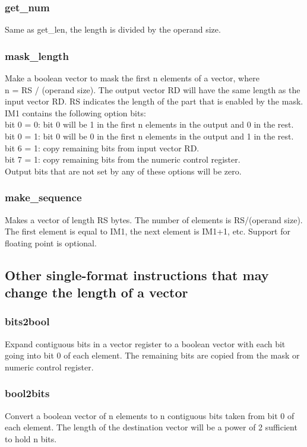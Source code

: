 \documentclass[forwardcom.tex]{subfiles}
\begin{document}
\subsubsection{get\_num}
Same as get\_len, the length is divided by the operand size.

\subsubsection{mask\_length}
Make a boolean vector to mask the first n elements of a vector, where \\
n = RS / (operand size). The output vector RD will have the same length as the input vector RD. RS indicates the length of the part that is enabled by the mask. IM1 contains the following option bits: \\
bit 0 = 0: bit 0 will be 1 in the first n elements in the output and 0 in the rest. \\
bit 0 = 1: bit 0 will be 0 in the first n elements in the output and 1 in the rest. \\
bit 6 = 1: copy remaining bits from input vector RD. \\
bit 7 = 1: copy remaining bits from the numeric control register. \\
Output bits that are not set by any of these options will be zero.

\subsubsection{make\_sequence}
Makes a vector of length RS bytes. The number of elements is RS/(operand size).
The first element is equal to IM1, the next element is IM1+1, etc.
Support for floating point is optional.
\vspace{2mm}

\subsection{Other single-format instructions that may change the length of a vector}

\subsubsection{bits2bool}
Expand contiguous bits in a vector register to a boolean vector with each bit going into bit 0 of each element. The remaining bits are copied from the mask or numeric control register.

\subsubsection{bool2bits}
Convert a boolean vector of n elements to n contiguous bits taken from bit 0 of each element. The length of the destination vector will be a power of 2 sufficient to hold n bits.
\end{document}

